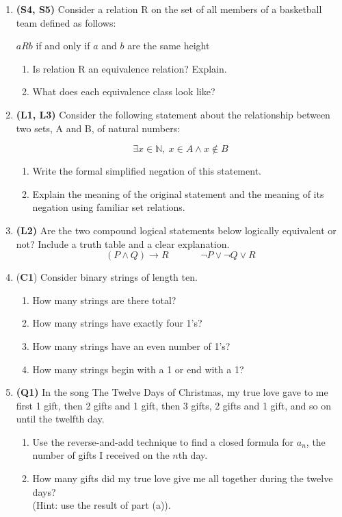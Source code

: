 \documentclass[12pt]{article}
\begin{document}
\begin{enumerate}
\item\textbf{(S4, S5)} Consider a relation R on the set of all members of a basketball team defined as follows:
\begin{center}
  $aRb$  if and only if $a$ and $b$ are the same height  
\end{center}
\begin{enumerate}
    \item Is relation R an equivalence relation? Explain.
    \item What does each equivalence class look like?
\end{enumerate}

\item
\textbf{(L1, L3)} Consider the following statement about the relationship between two sets, A and B, of natural numbers:


        \[\exists x \in \mathbb{N},\ x \in A \land x \not\in B \]
\begin{enumerate}
    \item 
    Write the formal simplified negation of this statement.
    \item
    Explain the meaning of the original statement and the meaning of its negation using familiar set relations.
\end{enumerate}

\item
\textbf{(L2)} Are the two compound logical statements below logically equivalent or not? Include a truth table and a clear explanation.
\[
(P \land Q) \rightarrow R \hspace{40pt} \lnot P \lor \lnot Q \lor R
\]

\item (\textbf{C1}) Consider binary strings of length ten.

\begin{enumerate}
    \item How many strings are there total?
    \item How many strings have exactly four 1's?
    \item How many strings have an even number of 1's?
    \item How many strings begin with a 1 or end with a 1?
\end{enumerate}

\item \textbf{(Q1)} In the song The Twelve Days of Christmas, my true love gave to me first 1 gift, then 2 gifts and 1 gift, then 3 gifts, 2 gifts and 1 gift, and so on until the twelfth day. 
\begin{enumerate}
    \item Use the reverse-and-add technique to find a closed formula for $a_n$, the number of gifts I received on the $n$th day.
    \item How many gifts did my true love give me all together during the twelve days? \\(Hint: use the result of part (a)).
\end{enumerate}


\end{enumerate}
\end{document}
